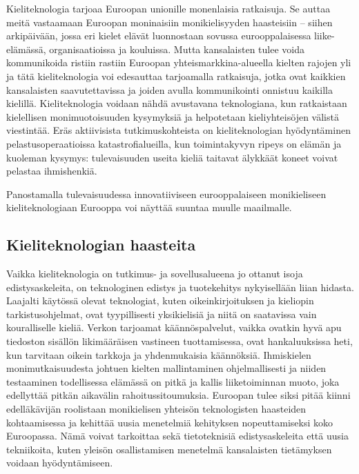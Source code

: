 \documentclass[]{../../metanetpaper}
\begin{document}
\begin{multicols}{2}
Kieliteknologia tarjoaa Euroopan unionille monenlaisia ratkaisuja. Se auttaa
meitä vastaamaan Euroopan moninaisiin monikielisyyden haasteisiin – siihen
arkipäivään, jossa eri kielet elävät luonnostaan sovussa eurooppalaisessa
liike-elämässä, organisaatioissa ja kouluissa. Mutta kansalaisten tulee voida
kommunikoida ristiin rastiin Euroopan yhteismarkkina-alueella kielten rajojen
yli ja tätä kieliteknologia voi edesauttaa tarjoamalla ratkaisuja, jotka ovat
kaikkien kansalaisten saavutettavissa ja joiden avulla kommunikointi
onnistuu kaikilla kielillä. Kieliteknologia voidaan nähdä avustavana
teknologiana, kun ratkaistaan kielellisen monimuotoisuuden kysymyksiä ja
helpotetaan kieliyhteisöjen välistä viestintää. Eräs aktiivisista tutkimuskohteista 
on kieliteknologian hyödyntäminen pelastusoperaatioissa katastrofialueilla, 
kun toimintakyvyn ripeys on elämän ja kuoleman kysymys: tulevaisuuden useita 
kieliä taitavat älykkäät koneet voivat pelastaa ihmishenkiä.

Panostamalla tulevaisuudessa innovatiiviseen eurooppalaiseen monikieliseen
kieliteknologiaan Eurooppa voi näyttää suuntaa muulle maailmalle.



\subsection{Kieliteknologian haasteita}


Vaikka kieliteknologia on tutkimus- ja sovellusalueena jo ottanut isoja
edistysaskeleita, on teknologinen edistys ja tuotekehitys nykyisellään liian
hidasta. Laajalti käytössä olevat teknologiat, kuten oikeinkirjoituksen ja
kieliopin tarkistusohjelmat, ovat tyypillisesti yksikielisiä ja niitä on
saatavissa vain kouralliselle kieliä. Verkon tarjoamat käännöspalvelut, vaikka
ovatkin hyvä apu tiedoston sisällön likimääräisen vastineen tuottamisessa,
ovat hankaluuksissa heti, kun tarvitaan oikein tarkkoja ja yhdenmukaisia
käännöksiä. Ihmiskielen monimutkaisuudesta johtuen kielten mallintaminen
ohjelmallisesti ja niiden testaaminen todellisessa elämässä on pitkä ja kallis
liiketoiminnan muoto, joka edellyttää pitkän aikavälin rahoitussitoumuksia.
Euroopan tulee siksi pitää kiinni edelläkävijän roolistaan monikielisen
yhteisön teknologisten haasteiden kohtaamisessa ja kehittää uusia menetelmiä
kehityksen nopeuttamiseksi koko Euroopassa. Nämä voivat tarkoittaa sekä
tietoteknisiä edistysaskeleita että uusia tekniikoita, kuten yleisön
osallistamisen menetelmä kansalaisten tietämyksen voidaan hyödyntämiseen.




\end{multicols}
\end{document}

